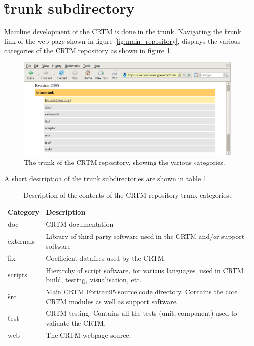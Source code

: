 \section{\f{trunk} subdirectory}
Mainline development of the CRTM is done in the trunk. Navigating the \href{crtm/trunk}{\f{trunk}} link of the web page shown in figure \ref{fig:main_repository}, displays the various categories of the CRTM repository as shown in figure \ref{fig:trunk_repository}. 
\begin{figure}[htb]
  \centering
  \includegraphics[scale=0.5]{graphics/trunk_repository.eps}
  \caption{The trunk of the CRTM repository, showing the various categories.}
  \label{fig:trunk_repository}
\end{figure}
A short description of the trunk subdirectories are shown in table \ref{tab:trunk_category_description}
\begin{table}[htb]
  \centering
  \begin{tabular}{p{2cm} p{12cm}}
    \hline
    \sffamily\textbf{Category} & \sffamily\textbf{Description} \\
    \hline\hline
    \f{doc}       & CRTM documentation\\
    \f{externals} & Library of third party software used in the CRTM and/or support software\\
    \f{fix}       & Coefficient datafiles used by the CRTM.\\
    \f{scripts}   & Hierarchy of script software, for various languages, used in CRTM build, testing, visualisation, etc.\\
    \f{src}       & Main CRTM Fortran95 source code directory. Contains the core CRTM modules as well as support software.\\
    \f{test}      & CRTM testing. Contains all the tests (unit, component) used to validate the CRTM.\\
    \f{web}       & The CRTM webpage source.\\
    \hline
  \end{tabular}
  \caption{Description of the contents of the CRTM repository trunk categories.}
  \label{tab:trunk_category_description}
\end{table}

